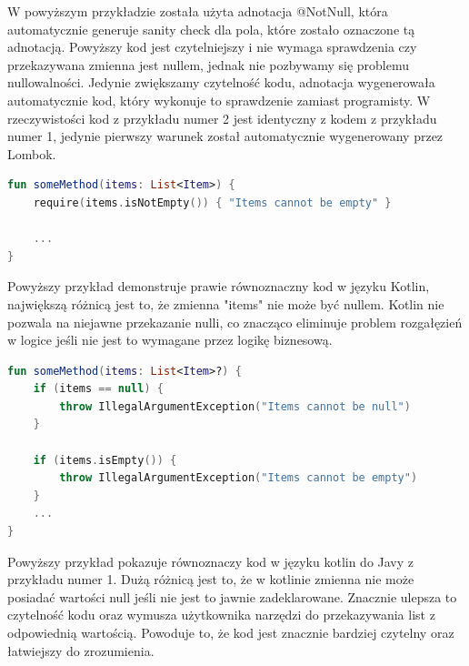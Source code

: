W powyższym przykładzie została użyta adnotacja @NotNull, która automatycznie generuje sanity check dla pola, które zostało oznaczone tą adnotacją.
Powyższy kod jest czytelniejszy i nie wymaga sprawdzenia czy przekazywana zmienna jest nullem, jednak nie pozbywamy się problemu nullowalności.
Jedynie zwiększamy czytelność kodu, adnotacja wygenerowała automatycznie kod, który wykonuje to sprawdzenie zamiast programisty.
W rzeczywistości kod z przykładu numer 2 jest identyczny z kodem z przykładu numer 1, jedynie pierwszy warunek został automatycznie wygenerowany przez Lombok.

\begin{lstlisting}[caption=Przykład w języku Kotlin, language=Kotlin]
fun someMethod(items: List<Item>) {
    require(items.isNotEmpty()) { "Items cannot be empty" }

    ...
}
\end{lstlisting}
Powyższy przykład demonstruje prawie równoznaczny kod w języku Kotlin, największą różnicą jest to, że zmienna "items" nie może być nullem.
Kotlin nie pozwala na niejawne przekazanie nulli, co znacząco eliminuje problem rozgałęzień w logice jeśli nie jest to wymagane przez logikę biznesową.
\begin{lstlisting}[caption=Przykład w języku Kotlin, language=Kotlin]
fun someMethod(items: List<Item>?) {
    if (items == null) {
        throw IllegalArgumentException("Items cannot be null")
    }

    if (items.isEmpty()) {
        throw IllegalArgumentException("Items cannot be empty")
    }
    ...
}
\end{lstlisting}
Powyższy przykład pokazuje równoznaczy kod w języku kotlin do Javy z przykładu numer 1.
Dużą różnicą jest to, że w kotlinie zmienna nie może posiadać wartości null jeśli nie jest to jawnie zadeklarowane.
Znacznie ulepsza to czytelność kodu oraz wymusza użytkownika narzędzi do przekazywania list z odpowiednią wartością.
Powoduje to, że kod jest znacznie bardziej czytelny oraz łatwiejszy do zrozumienia.

